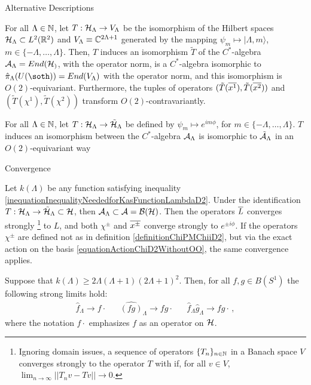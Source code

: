 \begin{frame}{Alternative Descriptions} %

     For all $\Lambda \in \mathbb N$, let $T: \mathcal H_\Lambda \to V_\Lambda$ be the isomorphism of the Hilbert spaces $\mathcal H_\Lambda \subset L^2(\mathbb R^2)$ and $V_\Lambda \equiv \mathbb C^{2\Lambda + 1}$ generated by the mapping $\psi_m \mapsto |\Lambda, m\rangle$, $m \in \{-\Lambda, \dots, \Lambda\}$. Then, $T$ induces an isomorphism $\tilde T$ of the $C^*$-algebra $\mathcal A_\Lambda = End(\mathcal H_)$, with the operator norm, is a $C^*$-algebra isomorphic to $\hat \pi_\Lambda(U(\soth)) = End(V_\Lambda)$ with the operator norm, and this isomorphism is $O(2)$-equivariant. Furthermore, the tuples of operators $(\tilde T(\overline{x^1}), \tilde T(\overline{x^2}))$ and $(\tilde T(\chi^1), \tilde T(\chi^2))$ transform $O(2)$-contravariantly.
     
     \begin{theorem}\label{theoremEquivalent*IsomorphismALgebraSphericaleimphiD2}
For all $\Lambda \in \mathbb N$, let $T: \mathcal H_\Lambda \to \tilde {\mathcal H}_\Lambda$ be defined by $\psi_m \mapsto e^{im\phi}$, for $m \in \{-\Lambda, \dots, \Lambda\}$. $T$ induces an isomorphism between the $C^*$-algebra $\mathcal A_\Lambda$ is isomorphic to $\tilde {\mathcal A}_\Lambda$ in an $O(2)$-equivariant way
\end{theorem}



    
\end{frame}

\begin{frame}{Convergence} %


    
    \label{theoremConvergesToQMD2}
Let $k(\Lambda)$ be any function satisfying inequality \eqref{inequationInequalityNeededforKasFunctionLambdaD2}. Under the identification $T: \mathcal H_\Lambda \to \tilde {\mathcal H}_\Lambda \subset \mathcal H$, then $\mathcal A_\Lambda \subset \mathcal A = \mathcal B (\mathcal H)$. Then the operators $\overline{L} $ converges strongly
\footnote{Ignoring domain issues, a sequence of operators $\{T_n\}_{n \in \mathbb N}$ in a Banach space $V$ converges strongly to the operator $T$ with if, for all $v \in V$, $\lim_{n \to \infty} ||T_n v - T v|| \to 0$.}
 to $L$, and both $\chi^\pm$ and $\overline{x^\pm}$ converge strongly to $e^{\pm i\phi}$. If the operators $\chi^\pm$ are defined not as in definition \ref{definitionChiPMChiiD2}, but via the exact action on the basis \eqref{equationActionChiD2WithoutOO}, the same convergence applies.
 
    
    Suppose that $k(\Lambda) \geq 2\Lambda(\Lambda+1)(2\Lambda+1)^2$. Then, for all $f, g \in B(S^1)$ the following strong limits hold:
\begin{align}
    \hat f_\Lambda \to f\cdot && \hat{(fg)}_\Lambda \to fg\cdot && \hat f_\Lambda \hat g_\Lambda \to fg \cdot\,,
\end{align}
where the notation $f\cdot$ emphasizes $f$ as an operator on $\mathcal H$.
\end{frame}

